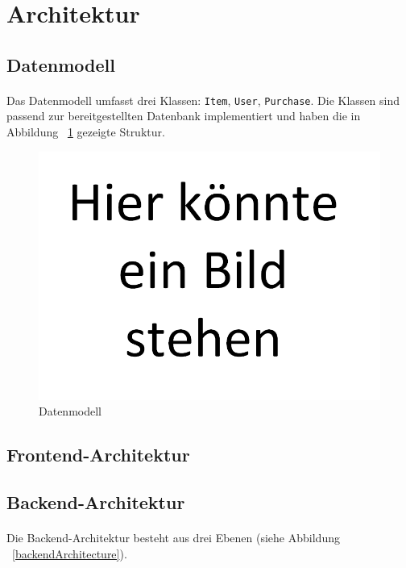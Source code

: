 \documentclass{scrartcl}
\begin{document}
	\section{Architektur} \label{architecture}
		\subsection{Datenmodell} \label{architecture.datamodel}
			\paragraph*{}
			Das Datenmodell umfasst drei Klassen: \texttt{Item}, \texttt{User}, \texttt{Purchase}. Die Klassen sind passend zur bereitgestellten Datenbank implementiert und haben die in Abbildung ~\ref{datamodel} gezeigte Struktur.
		
			\begin{figure}[!h]
				\label{datamodel}
				\centering
				\includegraphics[scale=0.5]{./figures/placeholder.png}
				\caption{Datenmodell}
			\end{figure}
		
		\subsection{Frontend-Architektur} \label{architecture.frontend}
		
		\subsection{Backend-Architektur} \label{architecture.backend}
			\paragraph*{}
			Die Backend-Architektur besteht aus drei Ebenen (siehe Abbildung ~\ref{backendArchitecture}).
			
\end{document}
